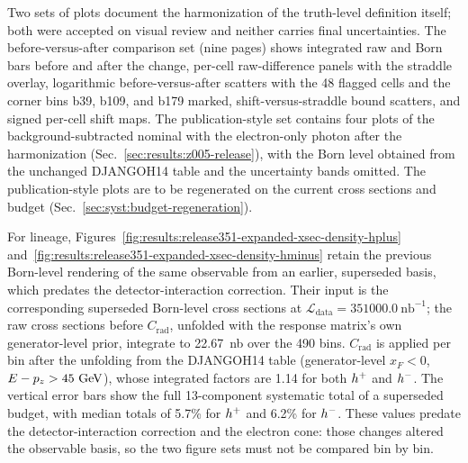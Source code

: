 Two sets of plots document the harmonization of the truth-level definition
itself; both were accepted on visual review and neither carries final
uncertainties.  The before-versus-after comparison set (nine pages) shows
integrated raw and Born bars before and after the change, per-cell raw-difference panels
with the straddle overlay, logarithmic before-versus-after scatters with the 48
flagged cells and the corner bins b39, b109, and b179 marked,
shift-versus-straddle bound scatters, and signed per-cell shift maps.  The
publication-style set contains four plots of the background-subtracted
nominal with the electron-only photon after the harmonization
(Sec.~\ref{sec:results:z005-release}), with the Born level obtained from the unchanged DJANGOH14
table and the uncertainty bands omitted.  The publication-style plots are to be
regenerated on the current cross sections and budget
(Sec.~\ref{sec:syst:budget-regeneration}).

For lineage, Figures~\ref{fig:results:release351-expanded-xsec-density-hplus}
and~\ref{fig:results:release351-expanded-xsec-density-hminus} retain the
previous Born-level rendering of the same observable from an earlier,
superseded basis, which predates the detector-interaction correction.  Their input
is the corresponding superseded Born-level cross sections at
$\mathcal{L}_{\mathrm{data}}=351000.0~\mathrm{nb}^{-1}$; the raw cross sections
before $C_{\mathrm{rad}}$, unfolded with the response matrix's own
generator-level prior, integrate to 22.67~nb over the 490 bins.
$C_{\mathrm{rad}}$ is applied per bin after the unfolding from the DJANGOH14
table (generator-level $x_F<0$, $E-p_z>45~\text{GeV}$), whose integrated factors are 1.14 for both
$h^{+}$ and $h^{-}$.  The vertical error bars show the full
13-component systematic total of a superseded budget,
with median totals of 5.7\% for $h^{+}$ and 6.2\% for $h^{-}$.  These
values predate the detector-interaction correction and the electron cone: those
changes altered the observable basis, so the two figure sets must not be
compared bin by bin.

